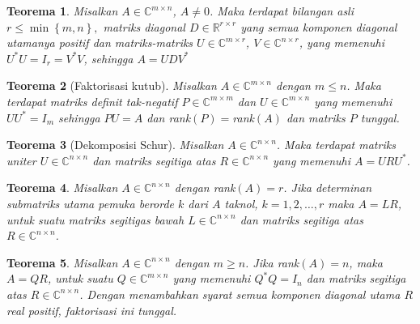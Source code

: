 \documentclass[11pt,a4paper]{article}
\theoremstyle{plain}
\newtheorem{theorem}{Teorema}[section]
\theoremstyle{definition}
\theoremstyle{remark}
\begin{document}
\begin{enumerate}
	\begin{bfseries}
		\begin{theorem}
			Misalkan $A\in \mathbb{C}^{m\times n}$, $A\ne 0$. Maka terdapat bilangan asli $r\leq \min\left\{m,n\right\},$ matriks diagonal $D\in\mathbb{R}^{r\times r}$ yang semua komponen diagonal utamanya positif dan matriks-matriks $U\in \mathbb{C}^{m\times r}$, $V\in \mathbb{C}^{n\times r}$, yang memenuhi $U^{\ast}U=I_{r}=V^{\ast}V$, sehingga $A=UDV^{\ast}$
		\end{theorem}
	\end{bfseries}

	\begin{bfseries}
		\begin{theorem}[Faktorisasi kutub]
			Misalkan $A\in \mathbb{C}^{m\times n}$ dengan $m\leq n$. Maka terdapat matriks definit tak-negatif $P\in \mathbb{C}^{m\times m}$ dan $U\in \mathbb{C}^{m\times n}$ yang memenuhi $UU^{\ast}=I_{m}$ sehingga $PU=A$ dan rank$(P)=$rank$(A)$ dan matriks $P$ tunggal.
		\end{theorem}
	\end{bfseries}

	\begin{bfseries}
		\begin{theorem}[Dekomposisi Schur]
			Misalkan $A\in \mathbb{C}^{n\times n}$. Maka terdapat matriks uniter $U\in \mathbb{C}^{n\times n}$ dan matriks segitiga atas $R\in \mathbb{C}^{n\times n}$ yang memenuhi $A=URU^{\ast}$.
		\end{theorem}
	\end{bfseries}

	\begin{bfseries}
		\begin{theorem}
			Misalkan $A\in \mathbb{C}^{n\times n}$ dengan rank$(A)=r$. Jika determinan submatriks utama pemuka berorde $k$ dari $A$ taknol, $k=1,2,\ldots,r$ maka $A=LR$, untuk suatu matriks segitigas bawah $L\in \mathbb{C}^{n\times n}$ dan matriks segitiga atas $R\in \mathbb{C}^{n\times n}$.
		\end{theorem}
	\end{bfseries}

	\begin{bfseries}
		\begin{theorem}
			Misalkan $A\in \mathbb{C}^{n\times n}$ dengan $m\geq n$. Jika rank$(A)=n$, maka $A=QR$, untuk suatu $Q\in \mathbb{C}^{m\times n}$ yang memenuhi $Q^{\ast}Q=I_{n}$ dan matriks segitiga atas $R\in \mathbb{C}^{n\times n}$. Dengan menambahkan syarat semua komponen diagonal utama $R$ real positif, faktorisasi ini tunggal.
		\end{theorem}
	\end{bfseries}


\end{enumerate}
\end{document}
